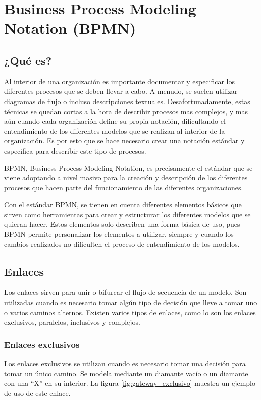 \section{Business Process Modeling Notation (BPMN)}

\subsection{¿Qué es?}

Al interior de una organización es importante documentar y especificar los diferentes procesos que se deben llevar a cabo. A menudo, se suelen utilizar diagramas de flujo o incluso descripciones textuales. Desafortunadamente, estas técnicas se quedan cortas a la hora de describir procesos mas complejos, y mas aún cuando cada organización define su propia notación, dificultando el entendimiento de los diferentes modelos que se realizan al interior de la organización. Es por esto que se hace necesario crear una notación estándar y especifica para describir este tipo de procesos.

BPMN, Business Process Modeling Notation, es precisamente el estándar que se viene adoptando a nivel masivo para la creación y descripción de los diferentes procesos que hacen parte del funcionamiento de las diferentes organizaciones.


Con el estándar BPMN, se tienen en cuenta diferentes elementos básicos que sirven como herramientas para crear y estructurar los diferentes modelos que se quieran hacer. Estos elementos solo describen una forma básica de uso, pues BPMN permite personalizar los elementos a utilizar, siempre y cuando los cambios realizados no dificulten el proceso de entendimiento de los modelos.

\subsection{Enlaces}

Los enlaces sirven para unir o bifurcar el flujo de secuencia de un modelo. Son utilizadas cuando es necesario tomar algún tipo de decisión que lleve a tomar uno o varios caminos alternos. Existen varios tipos de enlaces, como lo son los enlaces exclusivos, paralelos, inclusivos y complejos.

\subsubsection{Enlaces exclusivos}

Los enlaces exclusivos se utilizan cuando es necesario tomar una decisión para tomar un único camino. Se modela mediante un diamante vacío o un diamante con una ``X'' en su interior. La figura \ref{fig:gateway_exclusivo} muestra un ejemplo de uso de este enlace.

